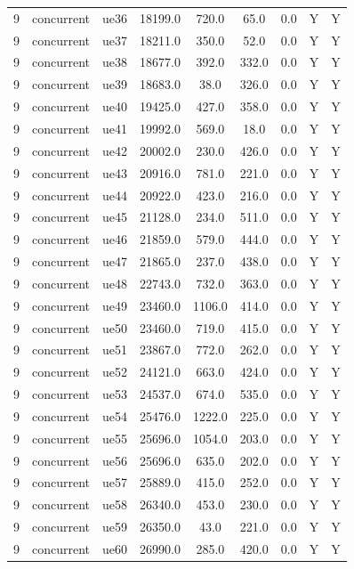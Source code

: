 \begin{table}[ht]
\begin{tabular}{|c|c|c|c|c|c|c|c|c|}
9 & concurrent & ue36 & 18199.0 & 720.0 & 65.0 & 0.0 & Y & Y \\
9 & concurrent & ue37 & 18211.0 & 350.0 & 52.0 & 0.0 & Y & Y \\
9 & concurrent & ue38 & 18677.0 & 392.0 & 332.0 & 0.0 & Y & Y \\
9 & concurrent & ue39 & 18683.0 & 38.0 & 326.0 & 0.0 & Y & Y \\
9 & concurrent & ue40 & 19425.0 & 427.0 & 358.0 & 0.0 & Y & Y \\
9 & concurrent & ue41 & 19992.0 & 569.0 & 18.0 & 0.0 & Y & Y \\
9 & concurrent & ue42 & 20002.0 & 230.0 & 426.0 & 0.0 & Y & Y \\
9 & concurrent & ue43 & 20916.0 & 781.0 & 221.0 & 0.0 & Y & Y \\
9 & concurrent & ue44 & 20922.0 & 423.0 & 216.0 & 0.0 & Y & Y \\
9 & concurrent & ue45 & 21128.0 & 234.0 & 511.0 & 0.0 & Y & Y \\
9 & concurrent & ue46 & 21859.0 & 579.0 & 444.0 & 0.0 & Y & Y \\
9 & concurrent & ue47 & 21865.0 & 237.0 & 438.0 & 0.0 & Y & Y \\
9 & concurrent & ue48 & 22743.0 & 732.0 & 363.0 & 0.0 & Y & Y \\
9 & concurrent & ue49 & 23460.0 & 1106.0 & 414.0 & 0.0 & Y & Y \\
9 & concurrent & ue50 & 23460.0 & 719.0 & 415.0 & 0.0 & Y & Y \\
9 & concurrent & ue51 & 23867.0 & 772.0 & 262.0 & 0.0 & Y & Y \\
9 & concurrent & ue52 & 24121.0 & 663.0 & 424.0 & 0.0 & Y & Y \\
9 & concurrent & ue53 & 24537.0 & 674.0 & 535.0 & 0.0 & Y & Y \\
9 & concurrent & ue54 & 25476.0 & 1222.0 & 225.0 & 0.0 & Y & Y \\
9 & concurrent & ue55 & 25696.0 & 1054.0 & 203.0 & 0.0 & Y & Y \\
9 & concurrent & ue56 & 25696.0 & 635.0 & 202.0 & 0.0 & Y & Y \\
9 & concurrent & ue57 & 25889.0 & 415.0 & 252.0 & 0.0 & Y & Y \\
9 & concurrent & ue58 & 26340.0 & 453.0 & 230.0 & 0.0 & Y & Y \\
9 & concurrent & ue59 & 26350.0 & 43.0 & 221.0 & 0.0 & Y & Y \\
9 & concurrent & ue60 & 26990.0 & 285.0 & 420.0 & 0.0 & Y & Y \\

\end{tabular}
\end{table}

